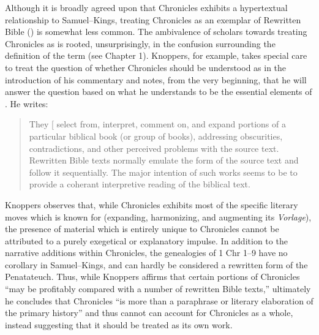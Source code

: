 Although it is broadly agreed upon that Chronicles exhibits a
hypertextual relationship to Samuel--Kings, treating Chronicles as an
exemplar of Rewritten Bible (\rwb) is somewhat less
common.\autocites[Though, not particularly
\emph{un}common:][]{campbell_zsengeller2014}{zahn_lim-collins2010}{bernstein_textus2005}[Alexander
considers Chronicles to be a ``prototype'' of \rwb,
see][100]{alexander_carson-williamson1988}[I have adopted the
terminology of hyper-/hypotext from Genette. In this case, to say that
Chronicles is a ``hypertext'' of Samuel--Kings is to say that it is
derivative, but not a commentary on Samuel--Kings. See][5]{genette1997}
The ambivalence of scholars towards treating Chronicles as
\rwb is rooted, unsurprisingly, in the confusion
surrounding the definition of the term (see Chapter 1). Knoppers, for
example, takes special care to treat the question of whether Chronicles
should be understood as \rwb in the introduction of his
commentary and notes, from the very beginning, that he will answer the
question based on what he understands to be the essential elements of
\rwb.\autocite[ , 129--134]{knoppers2003} He writes:

\begin{quote}
They {[}\rwb{]} select from, interpret, comment on, and
expand portions of a particular biblical book (or group of books),
addressing obscurities, contradictions, and other perceived problems
with the source text. Rewritten Bible texts normally emulate the form of
the source text and follow it sequentially. The major intention of such
works seems to be to provide a coherant interpretive reading of the
biblical text.\autocite[130]{knoppers2003}
\end{quote}

Knoppers observes that, while Chronicles exhibits most of the specific
literary moves which \rwb is known for (expanding,
harmonizing, and augmenting its \emph{Vorlage}), the presence of
material which is entirely unique to Chronicles cannot be attributed to
a purely exegetical or explanatory impulse. In addition to the narrative
additions within Chronicles, the genealogies of 1 Chr 1--9 have no
corollary in Samuel--Kings, and can hardly be considered a rewritten
form of the Penatateuch.\autocite[132]{knoppers2003} Thus, while
Knoppers affirms that certain portions of Chronicles ``may be profitably
compared with a number of rewritten Bible
texts,''\autocite[131]{knoppers2003} ultimately he concludes that
Chronicles ``is more than a paraphrase or literary elaboration of the
primary history''\autocite[134]{knoppers2003} and thus
\rwb cannot can account for Chronicles as a whole,
instead suggesting that it should be treated as its own
work.\autocite[131--134]{knoppers2003}

